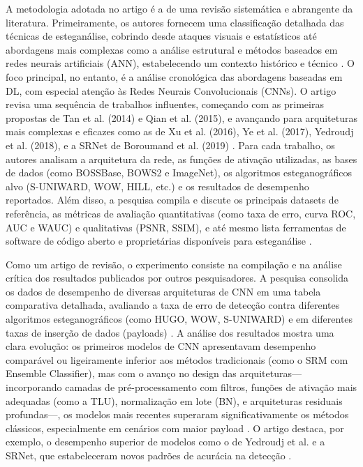 \documentclass[12pt]{article}
\begin{document}
A metodologia adotada no artigo é a de uma revisão sistemática e abrangente da literatura. Primeiramente, os autores fornecem uma classificação detalhada das técnicas de esteganálise, cobrindo desde ataques visuais e estatísticos até abordagens mais complexas como a análise estrutural e métodos baseados em redes neurais artificiais (ANN), estabelecendo um contexto histórico e técnico \cite{farooq2023systematic}. O foco principal, no entanto, é a análise cronológica das abordagens baseadas em DL, com especial atenção às Redes Neurais Convolucionais (CNNs). O artigo revisa uma sequência de trabalhos influentes, começando com as primeiras propostas de Tan et al. (2014) e Qian et al. (2015), e avançando para arquiteturas mais complexas e eficazes como as de Xu et al. (2016), Ye et al. (2017), Yedroudj et al. (2018), e a SRNet de Boroumand et al. (2019) \cite{farooq2023systematic}. Para cada trabalho, os autores analisam a arquitetura da rede, as funções de ativação utilizadas, as bases de dados (como BOSSBase, BOWS2 e ImageNet), os algoritmos esteganográficos alvo (S-UNIWARD, WOW, HILL, etc.) e os resultados de desempenho reportados. Além disso, a pesquisa compila e discute os principais datasets de referência, as métricas de avaliação quantitativas (como taxa de erro, curva ROC, AUC e WAUC) e qualitativas (PSNR, SSIM), e até mesmo lista ferramentas de software de código aberto e proprietárias disponíveis para esteganálise \cite{farooq2023systematic}.

Como um artigo de revisão, o experimento consiste na compilação e na análise crítica dos resultados publicados por outros pesquisadores. A pesquisa consolida os dados de desempenho de diversas arquiteturas de CNN em uma tabela comparativa detalhada, avaliando a taxa de erro de detecção contra diferentes algoritmos esteganográficos (como HUGO, WOW, S-UNIWARD) e em diferentes taxas de inserção de dados (payloads) \cite{farooq2023systematic}. A análise dos resultados mostra uma clara evolução: os primeiros modelos de CNN apresentavam desempenho comparável ou ligeiramente inferior aos métodos tradicionais (como o SRM com Ensemble Classifier), mas com o avanço no design das arquiteturas—incorporando camadas de pré-processamento com filtros, funções de ativação mais adequadas (como a TLU), normalização em lote (BN), e arquiteturas residuais profundas—, os modelos mais recentes superaram significativamente os métodos clássicos, especialmente em cenários com maior payload \cite{farooq2023systematic}. O artigo destaca, por exemplo, o desempenho superior de modelos como o de Yedroudj et al. e a SRNet, que estabeleceram novos padrões de acurácia na detecção \cite{farooq2023systematic}.
\end{document}
